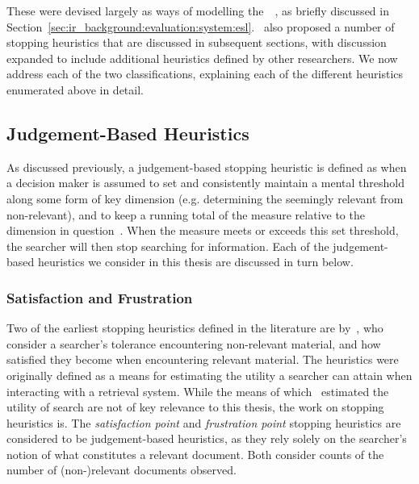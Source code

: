 These were devised largely as ways of modelling the~~\citep{cooper1968expected_search_length}, as briefly discussed in Section~\ref{sec:ir_background:evaluation:system:esl}.~\cite{nickles1995judgment} also proposed a number of stopping heuristics that are discussed in subsequent sections, with discussion expanded to include additional heuristics defined by other researchers. We now address each of the two classifications, explaining each of the different heuristics enumerated above in detail.

\subsection{Judgement-Based Heuristics}\label{sec:stopping_background:heuristics:judgement}
As discussed previously, a judgement-based stopping heuristic is defined as when a decision maker is assumed to set and consistently maintain a mental threshold along some form of key dimension (e.g. determining the seemingly relevant from non-relevant), and to keep a running total of the measure relative to the dimension in question~\citep{gettys1979hypothesis, nickles1995judgment}. When the measure meets or exceeds this set threshold, the searcher will then stop searching for information. Each of the judgement-based heuristics we consider in this thesis are discussed in turn below.

\subsubsection{Satisfaction and Frustration}\label{sec:stopping_background:heuristics:frustration}
Two of the earliest stopping heuristics defined in the literature are by~\cite{cooper1973retrieval_effectiveness_ii}, who consider a searcher's tolerance encountering non-relevant material, and how satisfied they become when encountering relevant material. The heuristics were originally defined as a means for estimating the utility a searcher can attain when interacting with a retrieval system. While the means of which~\cite{cooper1973retrieval_effectiveness_ii} estimated the utility of search are not of key relevance to this thesis, the work on stopping heuristics is. The \emph{satisfaction point} and \emph{frustration point} stopping heuristics are considered to be judgement-based heuristics, as they rely solely on the searcher's notion of what constitutes a relevant document. Both consider counts of the number of (non-)relevant documents observed.

